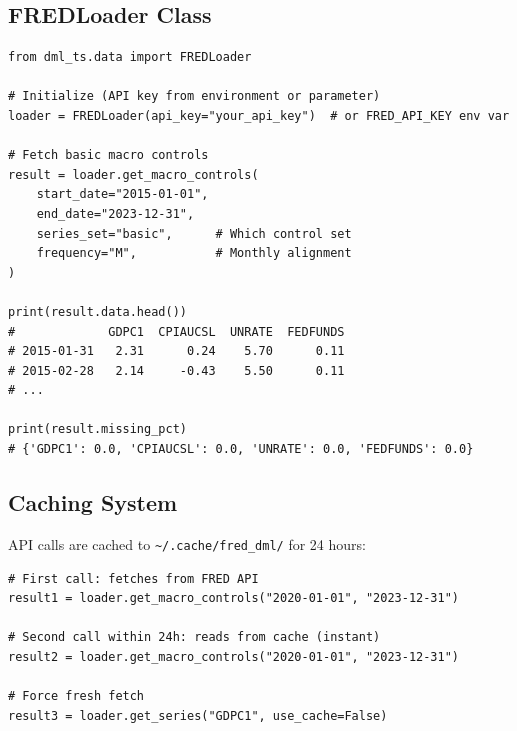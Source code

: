 
\subsection{FREDLoader Class}

\begin{verbatim}
from dml_ts.data import FREDLoader

# Initialize (API key from environment or parameter)
loader = FREDLoader(api_key="your_api_key")  # or FRED_API_KEY env var

# Fetch basic macro controls
result = loader.get_macro_controls(
    start_date="2015-01-01",
    end_date="2023-12-31",
    series_set="basic",      # Which control set
    frequency="M",           # Monthly alignment
)

print(result.data.head())
#             GDPC1  CPIAUCSL  UNRATE  FEDFUNDS
# 2015-01-31   2.31      0.24    5.70      0.11
# 2015-02-28   2.14     -0.43    5.50      0.11
# ...

print(result.missing_pct)
# {'GDPC1': 0.0, 'CPIAUCSL': 0.0, 'UNRATE': 0.0, 'FEDFUNDS': 0.0}
\end{verbatim}

\subsection{Caching System}

API calls are cached to \texttt{\textasciitilde/.cache/fred\_dml/} for 24 hours:

\begin{verbatim}
# First call: fetches from FRED API
result1 = loader.get_macro_controls("2020-01-01", "2023-12-31")

# Second call within 24h: reads from cache (instant)
result2 = loader.get_macro_controls("2020-01-01", "2023-12-31")

# Force fresh fetch
result3 = loader.get_series("GDPC1", use_cache=False)
\end{verbatim}

